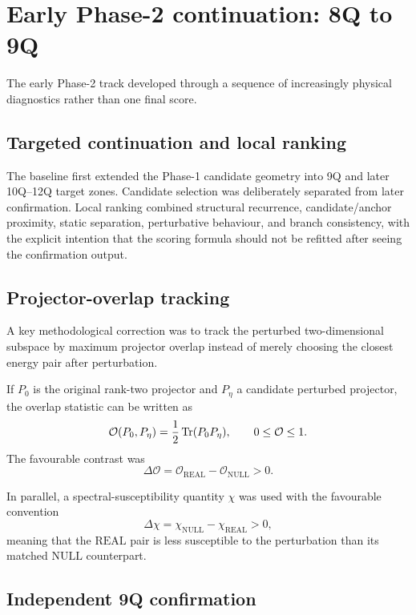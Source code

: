\documentclass[11pt,a4paper]{article}
\newcommand{\Real}{\mathrm{REAL}}
\newcommand{\Null}{\mathrm{NULL}}
\begin{document}
\section{Early Phase-2 continuation: 8Q to 9Q}

The early Phase-2 track developed through a sequence of increasingly physical
diagnostics rather than one final score.

\subsection{Targeted continuation and local ranking}

The baseline first extended the Phase-1 candidate geometry into 9Q and later
10Q--12Q target zones.  Candidate selection was deliberately separated from
later confirmation.  Local ranking combined structural recurrence,
candidate/anchor proximity, static separation, perturbative behaviour, and
branch consistency, with the explicit intention that the scoring formula
should not be refitted after seeing the confirmation output.

\subsection{Projector-overlap tracking}

A key methodological correction was to track the perturbed two-dimensional
subspace by maximum projector overlap instead of merely choosing the closest
energy pair after perturbation.

If \(P_0\) is the original rank-two projector and \(P_\eta\) a candidate
perturbed projector, the overlap statistic can be written as
\[
\mathcal O(P_0,P_\eta)
=
\frac{1}{2}\Tr(P_0P_\eta),
\qquad
0\le\mathcal O\le1.
\]
The favourable contrast was
\[
\Delta\mathcal O
=
\mathcal O_{\Real}-\mathcal O_{\Null}>0.
\]

In parallel, a spectral-susceptibility quantity \(\chi\) was used with the
favourable convention
\[
\Delta\chi
=
\chi_{\Null}-\chi_{\Real}>0,
\]
meaning that the \(\Real\) pair is less susceptible to the perturbation than
its matched \(\Null\) counterpart.

\subsection{Independent 9Q confirmation}
\end{document}
